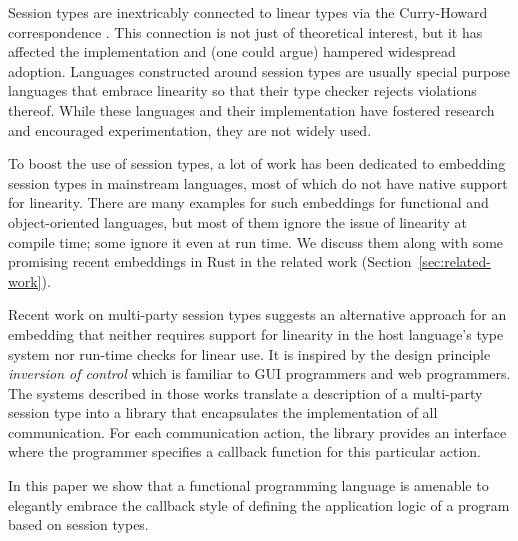 \documentclass[acmsmall,review,anonymous,screen]{acmart}
\begin{document}
Session types are inextricably connected to linear types via the
Curry-Howard correspondence
\cite{DBLP:conf/concur/CairesP10,DBLP:journals/mscs/CairesPT16,DBLP:journals/jfp/Wadler14}. 
This connection is not just of theoretical interest, but it
has affected the implementation and (one could argue) hampered widespread
adoption. Languages constructed around session types are usually
special purpose languages that embrace linearity so that their type
checker rejects violations thereof.
While these languages and their implementation have fostered research
and encouraged experimentation, they are not widely used.

To boost the use of session types, 
a lot of work has been dedicated to embedding session types in mainstream
languages, most of which do not have native support for linearity. 
There are many examples for such embeddings for functional
and object-oriented languages, but
most of them ignore the issue of linearity at compile time; some
ignore it even at run time. We discuss them along with some promising
recent embeddings in Rust in the
related work (Section~\ref{sec:related-work}).

Recent work on multi-party session types
\cite{DBLP:conf/cc/Miu0Y021,DBLP:journals/pacmpl/00020HNY20} suggests
an alternative approach for an embedding that neither requires support for
linearity in the host language's type system nor run-time checks for
linear use. It is 
inspired by the design principle \emph{inversion of control} which is
familiar to GUI programmers and web programmers. The systems described in
those works translate a description of a multi-party session type into
a library that encapsulates the implementation of all
communication. For each communication action, the library provides an
interface where the programmer specifies a callback function for this
particular action.

In this paper we show that a functional programming language is
amenable to elegantly embrace the callback style of defining the
application logic of a program based on session types.
\end{document}

